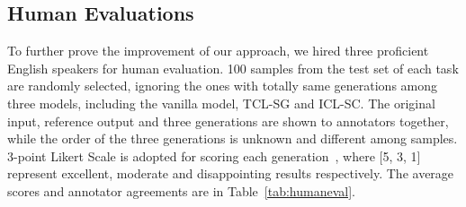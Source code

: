 








\subsection{Human Evaluations}

To further prove the improvement of our approach, we hired three proficient English speakers for human evaluation. 100 samples from the test set of each task are randomly selected, ignoring the ones with totally same generations among three models, including the vanilla model, TCL-SG and ICL-SC. The original input, reference output and three generations are shown to annotators together, while the order of the three generations is unknown and different among samples. 3-point Likert Scale is adopted for scoring each generation~\cite{gliwa2019samsum}, where [5, 3, 1] represent 
excellent, moderate and disappointing results 
respectively. The average scores and annotator agreements 
are in 
Table~\ref{tab:humaneval}.

